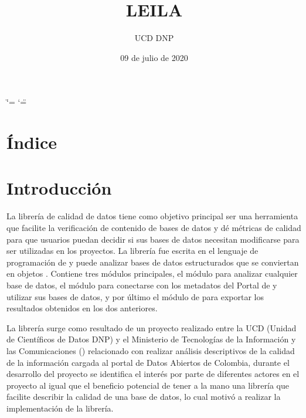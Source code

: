 \documentclass[letterpaper,10pt,openany,spanish]{sphinxmanual}
\title{LEILA}
\date{09 de julio de 2020}
\author{UCD \sphinxhyphen{} DNP}
\begin{document}
\ifdefined\shorthandoff
  \ifnum\catcode`\=\string=\active\shorthandoff{=}\fi
  \ifnum\catcode`\"=\active{}\fi
\fi

\pagestyle{empty}
\sphinxmaketitle
\pagestyle{plain}
\sphinxtableofcontents
\pagestyle{normal}
\label{\detokenize{index::doc}}



\chapter{Índice}
\label{\detokenize{genindex:indice}}\label{\detokenize{genindex:genindex}}\label{\detokenize{genindex::doc}}

\chapter{Introducción}
\label{\detokenize{introduccion:introduccion}}\label{\detokenize{introduccion::doc}}
La librería de calidad de datos tiene como objetivo principal ser una herramienta que facilite la verificación de contenido de bases de datos y dé métricas de calidad para que usuarios puedan decidir si sus bases de datos necesitan modificarse para ser utilizadas en los proyectos. La librería fue escrita en el lenguaje de programación de  y puede analizar bases de datos estructurados que se conviertan en objetos . Contiene tres módulos principales, el módulo {\hyperref[\detokenize{datos:datos}]{}} para analizar cualquier base de datos, el módulo {\hyperref[\detokenize{metadatos:metadatos}]{}} para conectarse con los metadatos del Portal de  y utilizar sus bases de datos, y por último el módulo de {\hyperref[\detokenize{reporte:reporte}]{}} para exportar los resultados obtenidos en los dos anteriores.

La librería surge como resultado de un proyecto realizado entre la UCD (Unidad de Científicos de Datos \sphinxhyphen{} DNP) y el Ministerio de Tecnologías de la Información y las Comunicaciones () relacionado con realizar análisis descriptivos de la calidad de la información cargada al portal de Datos Abiertos de Colombia, durante el desarrollo del proyecto se identifica el interés por parte de diferentes actores en el proyecto al igual que el beneficio potencial de tener a la mano una librería que facilite describir la calidad de una base de datos, lo cual motivó a realizar la implementación de la librería.
\end{document}
